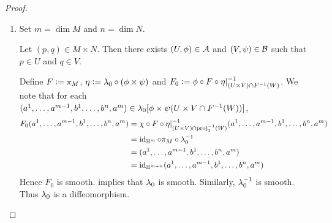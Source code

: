 \documentclass{book}
\begin{document}
\begin{proof}\
	\begin{enumerate}
		\item Set $m = \dim M$ and $n = \dim N$. 
		
		Let $(p,q) \in M \times N$. Then there exists $(U, \phi) \in \mathcal{A}$ and $(V, \psi) \in \mathcal{B}$ such that $p \in U$ and $q \in V$.
		
		Define $F \vcentcolon= \pi_M$, $\eta \vcentcolon= \lambda_0 \circ (\phi \times \psi)$ and $F_0 \vcentcolon= \phi \circ F \circ \eta|_{(U \times V) \cap F^{-1}(W)}^{-1}$. We note that for each $(a^1, \ldots, a^{m-1}, b^1, \ldots, b^n, a^m) \in \lambda_0[\phi \times \psi(U \times V \cap F^{-1}(W)) ]$, 
		\begin{align*}
			F_0 (a^1, \ldots, a^{m-1}, b^1, \ldots, b^n, a^m)
			& = \chi \circ F \circ \eta|_{(U \times V) \cap \operatorname{\text{proj}}_1^{-1}(W)}^{-1}(a^1, \ldots, a^{m-1}, b^1, \ldots, b^n, a^m) \\
			& = \operatorname{id}_{\mathbb{H}^m} \circ \pi_M \circ \lambda_0^{-1} \\
			& = (a^1, \ldots, a^{m-1}, b^1, \ldots, b^n, a^m) \\
			& = \operatorname{id}_{\mathbb{H}^{m+n}}(a^1, \ldots, a^{m-1}, b^1, \ldots, b^n, a^m)
		\end{align*}
		Hence $F_0$ is smooth.  implies that $\lambda_0$ is smooth. Similarly, $\lambda_0^{-1}$ is smooth. Thus $\lambda_0$ is a diffeomorphism.
		

\end{enumerate}
\end{proof}
\end{document}
